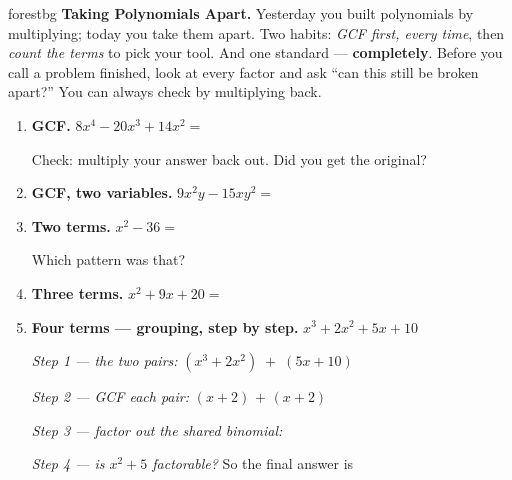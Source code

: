 \documentclass[10pt]{article}
\begin{document}
\namepartnerperiod

\vspace{0.08in}

\begin{headlinebox}{forestbg}
\small\textbf{Taking Polynomials Apart.} Yesterday you built polynomials by multiplying; today you
take them apart. Two habits: \emph{GCF first, every time}, then \emph{count the terms} to pick your
tool. And one standard --- \textbf{completely}. Before you call a problem finished, look at every
factor and ask ``can this still be broken apart?'' You can always check by multiplying back.
\end{headlinebox}

\vspace{0.06in}

\begin{tcolorbox}[colback=white, colframe=black!40, title=\textbf{Tier R --- Remediate},
    fonttitle=\bfseries, arc=1.5mm, left=3mm, right=3mm, top=2mm, bottom=2mm, breakable]
\begin{enumerate}[leftmargin=1.7em, itemsep=9pt]
  \item \textbf{GCF.} $8x^4 - 20x^3 + 14x^2 = $ \blank{5.5cm}

    \vspace{2pt}
    Check: multiply your answer back out. Did you get the original? \blank{1.4cm}

  \item \textbf{GCF, two variables.} $9x^2y - 15xy^2 = $ \blank{5.5cm}

  \item \textbf{Two terms.} $x^2 - 36 = $ \blank{5.0cm}

    \vspace{2pt}
    Which pattern was that? \blank{4.4cm}

  \item \textbf{Three terms.} $x^2 + 9x + 20 = $ \blank{5.0cm}

  \item \textbf{Four terms --- grouping, step by step.} $x^3 + 2x^2 + 5x + 10$

    \vspace{3pt}
    \emph{Step 1 --- the two pairs:} \; $(x^3 + 2x^2) \; + \; (5x + 10)$

    \vspace{3pt}
    \emph{Step 2 --- GCF each pair:} \; \blank{2.0cm}$(x+2)$ \; $+$ \; \blank{2.0cm}$(x+2)$

    \vspace{3pt}
    \emph{Step 3 --- factor out the shared binomial:} \blank{4.6cm}

    \vspace{3pt}
    \emph{Step 4 --- is $x^2+5$ factorable?} \blank{1.4cm} \; So the final answer is
    \blank{4.0cm}
\end{enumerate}
\end{tcolorbox}
\end{document}
